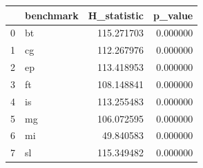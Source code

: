 \begin{tabular}{llrr}
\toprule
 & benchmark & H_statistic & p_value \\
\midrule
0 & bt & 115.271703 & 0.000000 \\
1 & cg & 112.267976 & 0.000000 \\
2 & ep & 113.418953 & 0.000000 \\
3 & ft & 108.148841 & 0.000000 \\
4 & is & 113.255483 & 0.000000 \\
5 & mg & 106.072595 & 0.000000 \\
6 & mi & 49.840583 & 0.000000 \\
7 & sl & 115.349482 & 0.000000 \\
\bottomrule
\end{tabular}
